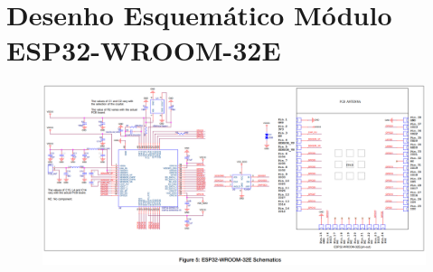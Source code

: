 \chapter[Esquema módulo ESP]{Desenho Esquemático Módulo ESP32-WROOM-32E}

\label{ane:mod}

\begin{landscape}
    \begin{figure}[htb]
        \begin{center}
            \includegraphics[scale=0.5]{ane_esp_mod/mod-esq.png}
        \end{center}
    \end{figure}
\end{landscape}